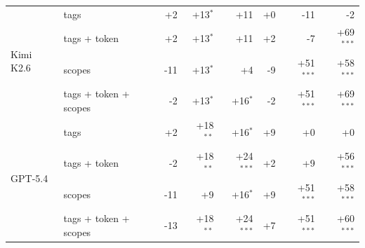 \begin{tabular}{llrrrrrr}
\midrule
\multirow{4}{*}{Kimi K2.6} & tags & +2 & +13$^{*}$ & +11 & +0 & -11 & -2 \\
 & tags + token & +2 & +13$^{*}$ & +11 & +2 & -7 & +69$^{***}$ \\
 & scopes & -11 & +13$^{*}$ & +4 & -9 & +51$^{***}$ & +58$^{***}$ \\
 & tags + token + scopes & -2 & +13$^{*}$ & +16$^{*}$ & -2 & +51$^{***}$ & +69$^{***}$ \\
\midrule
\multirow{4}{*}{GPT-5.4} & tags & +2 & +18$^{**}$ & +16$^{*}$ & +9 & +0 & +0 \\
 & tags + token & -2 & +18$^{**}$ & +24$^{***}$ & +2 & +9 & +56$^{***}$ \\
 & scopes & -11 & +9 & +16$^{*}$ & +9 & +51$^{***}$ & +58$^{***}$ \\
 & tags + token + scopes & -13 & +18$^{**}$ & +24$^{***}$ & +7 & +51$^{***}$ & +60$^{***}$ \\
\bottomrule
\end{tabular}
